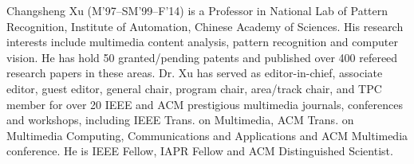 \documentclass[journal]{IEEEtran}
\begin{document}
\begin{IEEEbiography}{Changsheng Xu}
(M’97–SM’99–F’14) is a Professor in National Lab of Pattern Recognition, Institute of Automation, Chinese Academy of Sciences. His research interests include multimedia content analysis, pattern recognition and computer vision. He has hold 50 granted/pending patents and published over 400 refereed research papers in these areas. Dr. Xu has served as editor-in-chief, associate editor, guest editor, general chair, program chair, area/track chair, and TPC member for over 20 IEEE and ACM prestigious multimedia journals, conferences and workshops, including IEEE Trans. on Multimedia, ACM Trans. on Multimedia Computing, Communications and Applications and ACM Multimedia conference. He is IEEE Fellow, IAPR Fellow and ACM Distinguished Scientist.
\end{IEEEbiography}
\end{document}
